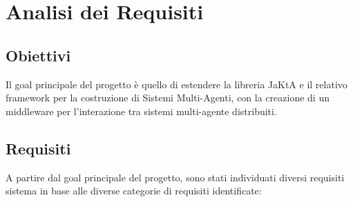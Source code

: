 \section{Analisi dei Requisiti}

%
%

%

\subsection{Obiettivi}

Il goal principale del progetto è quello di estendere la libreria JaKtA e il relativo framework per la costruzione di Sistemi Multi-Agenti,
con la creazione di un middleware per l'interazione tra sistemi multi-agente distribuiti.

\subsection{Requisiti}
A partire dal goal principale del progetto, sono stati individuati diversi requisiti sistema in base alle diverse categorie di requisiti identificate:

